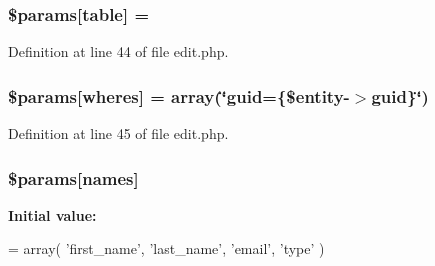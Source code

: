 \subsubsection[{\texorpdfstring{\$params}{$params}}]{\setlength{\rightskip}{0pt plus 5cm}\$params\mbox{[}\textquotesingle{}table\textquotesingle{}\mbox{]} = \textquotesingle{}}\hypertarget{actions_2administrator_2user_2edit_8php_a6d3a8e48e146c9e256cd43475253986e}{}\label{actions_2administrator_2user_2edit_8php_a6d3a8e48e146c9e256cd43475253986e}


Definition at line 44 of file edit.\+php.

\subsubsection[{\texorpdfstring{\$params}{$params}}]{\setlength{\rightskip}{0pt plus 5cm}\$params\mbox{[}\textquotesingle{}wheres\textquotesingle{}\mbox{]} = array(\char`\"{}guid=\textquotesingle{}\{\$entity-\/$>$guid\}\textquotesingle{}\char`\"{})}\hypertarget{actions_2administrator_2user_2edit_8php_ac68e07fb8a2ea1d5eeef67f9502d9b8b}{}\label{actions_2administrator_2user_2edit_8php_ac68e07fb8a2ea1d5eeef67f9502d9b8b}


Definition at line 45 of file edit.\+php.

\subsubsection[{\texorpdfstring{\$params}{$params}}]{\setlength{\rightskip}{0pt plus 5cm}\$params\mbox{[}\textquotesingle{}names\textquotesingle{}\mbox{]}}\hypertarget{actions_2administrator_2user_2edit_8php_a67ec260a883c7da762004ba9e18899de}{}\label{actions_2administrator_2user_2edit_8php_a67ec260a883c7da762004ba9e18899de}
{\bfseries Initial value\+:}
\begin{DoxyCode}
= array(
    \textcolor{stringliteral}{'first\_name'},
    \textcolor{stringliteral}{'last\_name'},
    \textcolor{stringliteral}{'email'},
    \textcolor{stringliteral}{'type'}
)
\end{DoxyCode}


